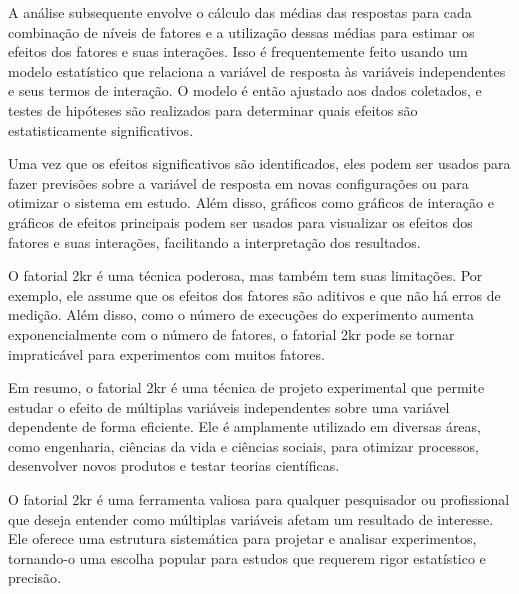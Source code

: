 A análise subsequente envolve o cálculo das médias das respostas para cada combinação de níveis de fatores e a utilização dessas médias para estimar os efeitos dos fatores e suas interações. Isso é frequentemente feito usando um modelo estatístico que relaciona a variável de resposta às variáveis independentes e seus termos de interação. O modelo é então ajustado aos dados coletados, e testes de hipóteses são realizados para determinar quais efeitos são estatisticamente significativos\cite{lehmann2006theory}.

Uma vez que os efeitos significativos são identificados, eles podem ser usados para fazer previsões sobre a variável de resposta em novas configurações ou para otimizar o sistema em estudo. Além disso, gráficos como gráficos de interação e gráficos de efeitos principais podem ser usados para visualizar os efeitos dos fatores e suas interações, facilitando a interpretação dos resultados\cite{montgomery2017design}.

O fatorial 2kr é uma técnica poderosa, mas também tem suas limitações. Por exemplo, ele assume que os efeitos dos fatores são aditivos e que não há erros de medição. Além disso, como o número de execuções do experimento aumenta exponencialmente com o número de fatores, o fatorial 2kr pode se tornar impraticável para experimentos com muitos fatores\cite{box2005statistics}.

Em resumo, o fatorial 2kr é uma técnica de projeto experimental que permite estudar o efeito de múltiplas variáveis independentes sobre uma variável dependente de forma eficiente. Ele é amplamente utilizado em diversas áreas, como engenharia, ciências da vida e ciências sociais, para otimizar processos, desenvolver novos produtos e testar teorias científicas\cite{wasserman2004all}.

O fatorial 2kr é uma ferramenta valiosa para qualquer pesquisador ou profissional que deseja entender como múltiplas variáveis afetam um resultado de interesse. Ele oferece uma estrutura sistemática para projetar e analisar experimentos, tornando-o uma escolha popular para estudos que requerem rigor estatístico e precisão\cite{lehmann2006theory}.

